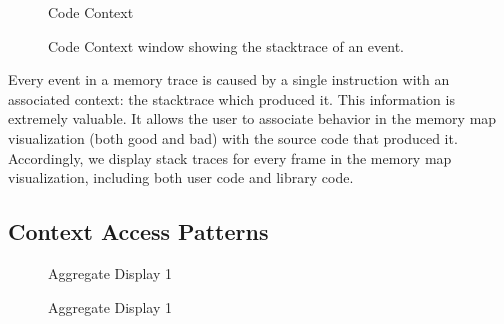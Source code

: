 \documentclass[annual]{acmsiggraph}
\begin{document}
  	\begin{figure}[t]
  		\centering
      Code Context
  		\caption{Code Context window showing the stacktrace of an event.}
      \label{fig:system}
  	\end{figure}


    Every event in a memory trace is caused by a single instruction with an associated context: the stacktrace which produced it.
    This information is extremely valuable.
    It allows the user to associate behavior in the memory map visualization (both good and bad) 
      with the source code that produced it.
    Accordingly, we display stack traces for every frame in the memory map visualization, 
      including both user code and library code.
  
  \subsection{Context Access Patterns}

  	\begin{figure}[t]
  		\centering
      Aggregate Display 1
  		\caption{Aggregate Display 1}
      \label{fig:system}
  	\end{figure}
\end{document}
